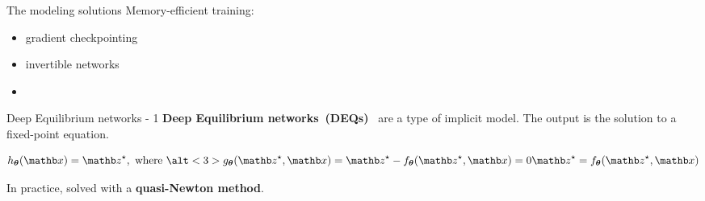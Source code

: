 \begin{frame}{The modeling solutions}
    Memory-efficient training:
    \begin{itemize}[<+->]
        \item gradient checkpointing~\citep{Chen2016TrainingCost}
        \item invertible networks~\citep{Gomez2017TheActivations,Sander2021MomentumNetworks}
        \item {}
    \end{itemize}
\end{frame}

\begin{frame}{Deep Equilibrium networks - 1}
    \textbf{Deep Equilibrium networks~(DEQs)}~\citep{Bai2019DeepModels} are a type of implicit model.
    The output is the solution to a fixed-point equation.

    \begin{equation*}
        h_{\thetab}(\xb) = \zb^\star, \text{ where } \alt<3>{g_\thetab(\zb^\star, \xb) = \zb^\star - f_\thetab(\zb^\star, \xb) = 0}{\zb^\star = f_\thetab(\zb^\star, \xb)}
    \end{equation*}

    \pause

    In practice, solved with a \textbf{quasi-Newton method}.
\end{frame}

